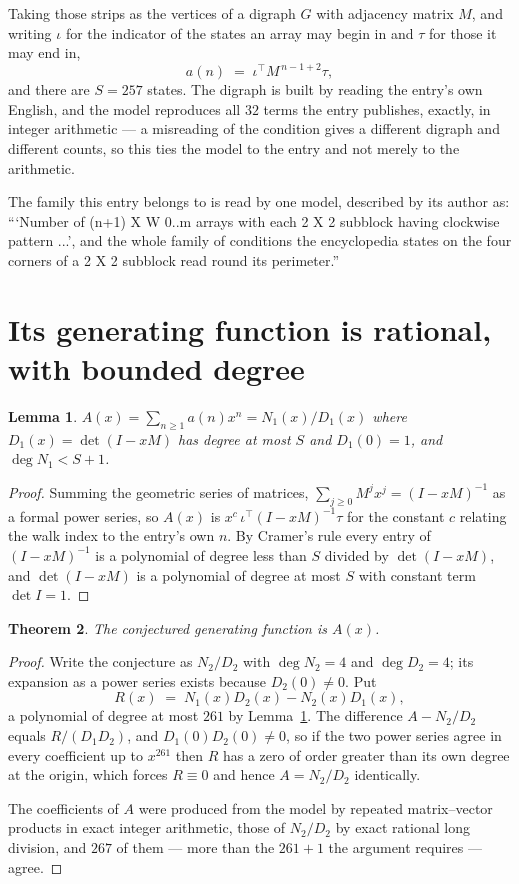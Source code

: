 \documentclass[11pt,a4paper]{article}
\theoremstyle{plain}
\newtheorem{theorem}{Theorem}
\newtheorem{lemma}[theorem]{Lemma}
\theoremstyle{definition}
\begin{document}
Taking those strips as the vertices of a digraph $G$ with adjacency matrix $M$, and writing
$\iota$ for the indicator of the states an array may begin in and $\tau$ for those it may end
in,
\[
a(n)\;=\;\iota^{\!\top}M^{\,n-1+2}\tau ,
\]
and there are $S=257$ states. The digraph is built by reading the entry's own English, and the
model reproduces all $32$ terms the entry publishes, exactly, in integer arithmetic --- a
misreading of the condition gives a different digraph and different counts, so this ties the
model to the entry and not merely to the arithmetic.

The family this entry belongs to is read by one model, described by its author as: ```Number of (n+1) X W 0..m arrays with each 2 X 2 subblock having clockwise pattern ...', and the whole family of conditions the encyclopedia states on the four corners of a 2 X 2 subblock read round its perimeter.''


\section{Its generating function is rational, with bounded degree}

\begin{lemma}\label{lem:rat}
$A(x)=\sum_{n\ge1}a(n)x^n=N_1(x)/D_1(x)$ where $D_1(x)=\det(I-xM)$ has degree at most
$S$ and $D_1(0)=1$, and $\deg N_1<S+1$.
\end{lemma}

\begin{proof}
Summing the geometric series of matrices, $\sum_{j\ge0}M^jx^j=(I-xM)^{-1}$ as a formal
power series, so $A(x)$ is $x^{c}\,\iota^{\!\top}(I-xM)^{-1}\tau$ for the constant $c$
relating the walk index to the entry's own $n$. By Cramer's rule every entry of
$(I-xM)^{-1}$ is a polynomial of degree less than $S$ divided by $\det(I-xM)$, and
$\det(I-xM)$ is a polynomial of degree at most $S$ with constant term $\det I=1$.
\end{proof}

\begin{theorem}
The conjectured generating function is $A(x)$.
\end{theorem}

\begin{proof}
Write the conjecture as $N_2/D_2$ with $\deg N_2=4$ and $\deg D_2=4$; its expansion as a
power series exists because $D_2(0)\neq0$. Put
\[
R(x)\;=\;N_1(x)D_2(x)-N_2(x)D_1(x),
\]
a polynomial of degree at most $261$ by Lemma~\ref{lem:rat}. The difference
$A-N_2/D_2$ equals $R/(D_1D_2)$, and $D_1(0)D_2(0)\neq0$, so if the two power series agree in
every coefficient up to $x^{261}$ then $R$ has a zero of order greater than its own
degree at the origin, which forces $R\equiv0$ and hence $A=N_2/D_2$ identically.

The coefficients of $A$ were produced from the model by repeated matrix--vector products in
exact integer arithmetic, those of $N_2/D_2$ by exact rational long division, and $267$
of them --- more than the $261+1$ the argument requires --- agree.
\end{proof}
\end{document}
